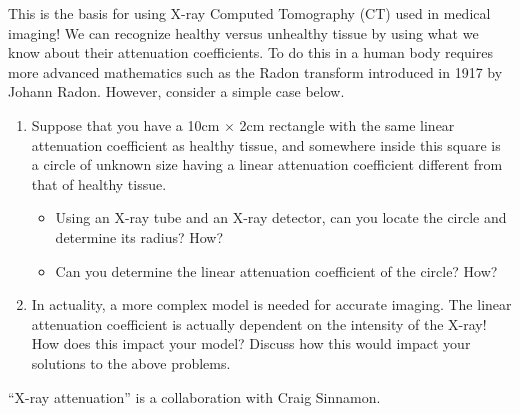 \vfill

This is the basis for using X-ray Computed Tomography (CT) used in medical imaging! We can recognize healthy versus unhealthy tissue by using what we know about their attenuation coefficients. To do this in a human body requires more advanced mathematics such as the Radon transform introduced in 1917 by Johann Radon. However, consider a simple case below.

\vfill

\begin{enumerate}[resume,label=\emph{\arabic*.}]
\item Suppose that you have a 10cm $\times$ 2cm rectangle with the same linear attenuation coefficient as healthy tissue, and somewhere inside this square is a circle of unknown size having a linear attenuation coefficient different from that of healthy tissue.
\begin{itemize}
\item  Using an X-ray tube and an X-ray detector, can you locate the circle and determine its radius? How?
\item  Can you determine the linear attenuation coefficient of the circle? How?
 \end{itemize}

 \vfill
 
 \item In actuality, a more complex model is needed for accurate imaging. The linear attenuation coefficient is actually dependent on the intensity of the X-ray! How does this impact your model? Discuss how this would impact your solutions to the above problems.

\end{enumerate}

\vfill

\hfill ``X-ray attenuation'' is a collaboration with Craig Sinnamon.
\begin{noexercises}
\end{noexercises}